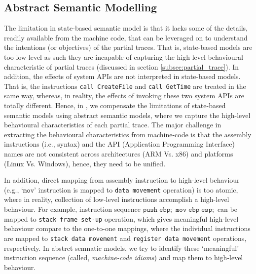 \subsection{Abstract Semantic Modelling} \label{subsec:abs_sem_mod}

The limitation in state-based semantic model is that it lacks some of the details, readily available from the machine code, that can be leveraged on to understand the intentions (or objectives) of the partial traces. That is, state-based models are too low-level as such they are incapable of capturing the high-level behavioural characteristic of partial traces (discussed in section \ref{subsec:partial_trace}). In addition, the effects of system APIs are not interpreted in state-based models. That is, the instructions \texttt{call CreateFile} and \texttt{call GetTime} are treated in the same way, whereas, in reality, the effects of invoking these two system APIs are totally different. Hence, in \tool, we compensate the limitations of state-based semantic models using abstract semantic models, where we capture the high-level behavioural characteristics of each partial trace. The major challenge in extracting the behavioural characteristics from machine-code is that the assembly instructions (i.e., syntax) and the API (Application Programming Interface) names are not consistent across architectures (ARM Vs. x86) and platforms (Linux Vs. Windows), hence, they need to be unified. 

In addition, direct mapping from assembly instruction to high-level behaviour (e.g., `$\mathtt{mov}$' instruction is mapped to \texttt{data movement} operation) is too atomic, where in reality, collection of low-level instructions accomplish a high-level behaviour. For example, instruction sequence $\mathtt{push \; ebp;}$ $\mathtt{mov\;ebp\;esp;}$ can be mapped to \texttt{stack frame set-up} operation, which gives meaningful high-level behaviour compare to the one-to-one mappings, where the individual instructions are mapped to \texttt{stack data movement} and \texttt{register data movement} operations, respectively. In abstrct semnatic models, we try to identify these `meaningful' instruction sequence (called, \textit{machine-code idioms}) and map them to high-level behaviour.


